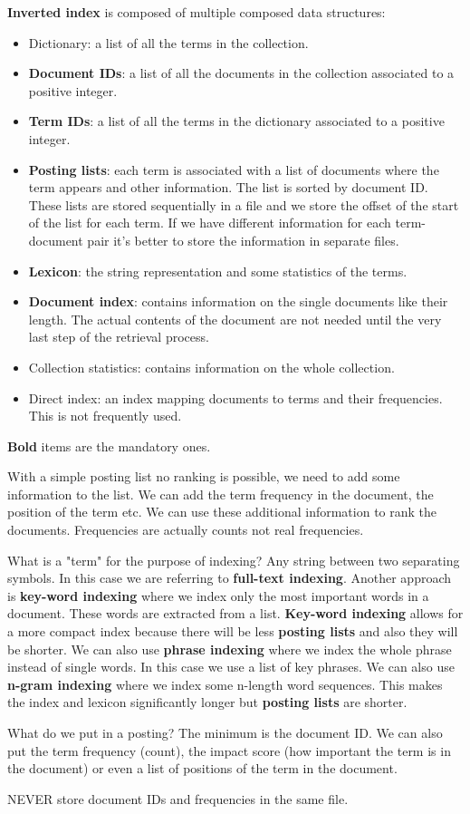 \textbf{Inverted index} is composed of multiple composed data structures:
\begin{itemize}
    \item Dictionary: a list of all the terms in the collection.
    \item \textbf{Document IDs}: a list of all the documents in the collection
    associated to a positive integer.
    \item \textbf{Term IDs}: a list of all the terms in the dictionary
    associated to a positive integer.
    \item \textbf{Posting lists}: each term is associated with a list of documents 
    where the term appears and other information. The list is sorted
    by document ID. These lists are stored sequentially in a file and we store the
    offset of the start of the list for each term.
    If we have different information for each term-document pair it's better 
    to store the information in separate files.
    \item \textbf{Lexicon}: the string representation and some statistics of the terms.
    \item \textbf{Document index}: contains information on the single documents like
    their length. The actual contents of the document are not needed until the very
    last step of the retrieval process.
    \item Collection statistics: contains information on the whole collection.
    \item Direct index: an index mapping documents to terms and their frequencies.
    This is not frequently used.
\end{itemize}
\textbf{Bold} items are the mandatory ones.

With a simple posting list no ranking is possible, we need to
add some information to the list. We can add the term frequency
in the document, the position of the term etc. We can use
these additional information to rank the documents.
Frequencies are actually counts not real frequencies.

What is a "term" for the purpose of indexing?
Any string between two separating symbols. In this case we are
referring to \textbf{full-text indexing}.
Another approach is \textbf{key-word indexing} where we index
only the most important words in a document. These words are
extracted from a list.
\textbf{Key-word indexing} allows for a more compact index because
there will be less \textbf{posting lists} and also they will be shorter.
We can also use \textbf{phrase indexing} where we index the whole
phrase instead of single words. In this case we use a list of 
key phrases.
We can also use \textbf{n-gram indexing} where we index some n-length
word sequences. This makes the index and lexicon significantly longer
but \textbf{posting lists} are shorter.

What do we put in a posting?
The minimum is the document ID. We can also put the term frequency (count),
the impact score (how important the term is in the document) or even
a list of positions of the term in the document.

NEVER store document IDs and frequencies in the same file.